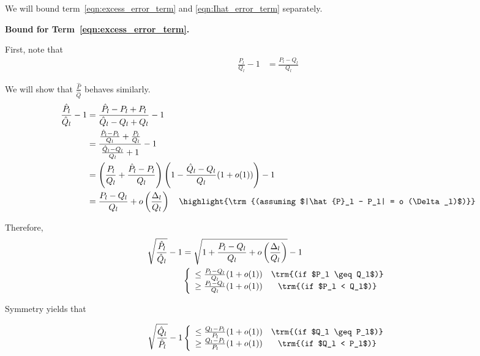 \documentclass{article}
\begin{document}
We will bound term~\ref{eqn:excess_error_term} and \ref{eqn:Ihat_error_term} separately. 

\textbf{Bound for Term~\ref{eqn:excess_error_term}.} 

First, note that 
\begin{align*}
 \frac{P_l}{Q_l} - 1 &= \frac{P_l - Q_l}{Q_l}  
\end{align*}

We will show that $\frac{\hat{P}}{\hat{Q}}$ behaves similarly. 
\begin{align*}
\frac{\hat{P}_l}{\hat{Q}_l} - 1 &= 
     \frac{ \hat{P}_l - P_l + P_l }{ \hat{Q}_l - Q_l + Q_l} -1  \\
  &=  \frac{  \frac{\hat{P}_l - P_l}{Q_l} + \frac{P_l}{Q_l}}
       { \frac{\hat{Q}_l - Q_l}{Q_l} + 1} - 1 \\
 &= \left( \frac{P_l}{Q_l} + \frac{\hat{P}_l - P_l}{Q_l} \right)
    \left( 1 - \frac{\hat{Q}_l - Q_l}{Q_l} (1+o(1)) \right) -1  \\
 &= \frac{P_l-Q_l}{Q_l} + o\left( \frac{\Delta_l}{Q_l} \right) \quad \highlight{\trm{(assuming $|\hat{P}_l - P_l| = o (\Delta_l)$)}}
\end{align*}

Therefore, 
\begin{align*}
\sqrt{ \frac{\hat{P}_l}{\hat{Q}_l}} - 1 &= 
   \sqrt{ 1 + \frac{P_l - Q_l}{Q_l} + o\left( \frac{\Delta_l}{Q_l} \right)}  - 1\\
  & \left\{ \begin{array}{cc}
      \leq \frac{P_l - Q_l}{Q_l} (1+o(1)) & \trm{(if $P_l \geq Q_l$)} \\
      \geq \frac{P_l - Q_l}{Q_l} (1+o(1)) & \trm{(if $P_l < Q_l$)} 
     \end{array} \right.
\\
\end{align*}

Symmetry yields that 

\begin{align*}
\sqrt{ \frac{\hat{Q}_l}{\hat{P}_l} } - 1  &
   \left\{ \begin{array}{cc}
      \leq \frac{Q_l - P_l}{P_l} (1+o(1)) & \trm{(if $Q_l \geq P_l$)} \\
      \geq \frac{Q_l - P_l}{P_l} (1+o(1)) & \trm{(if $Q_l < P_l$)} 
     \end{array} \right. \\
\end{align*}
\end{document}
